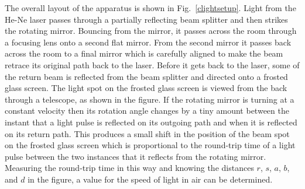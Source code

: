 \documentclass{revtex4}
\begin{document}
The overall layout of the apparatus is shown in Fig.~\ref{clightsetup}.
Light from the He-Ne laser passes through a partially reflecting beam splitter
and then strikes the rotating mirror.  Bouncing from the mirror, it passes
across the room through a focusing lens onto a second flat mirror.  From the
second mirror it passes back across the room to a final mirror which is
carefully aligned to make the beam retrace its original path back to the
laser.  Before it gets back to the laser, some of the return beam is 
reflected from the beam splitter and directed onto a frosted glass screen.
The light spot on the frosted glass screen is viewed from the back through
a telescope, as shown in the figure.  If the rotating mirror is turning at
a constant velocity then its rotation angle changes by a tiny amount between
the instant that a light pulse is reflected on its outgoing path and when it
is reflected on its return path.  This produces a small shift in the position
of the beam spot on the frosted glass screen which is proportional to the
round-trip time of a light pulse between the two instances that it reflects
from the rotating mirror.  Measuring the round-trip time in this way and
knowing the distances $r$, $s$, $a$, $b$, and $d$ in the figure, a value for
the speed of light in air can be determined.
\end{document}
